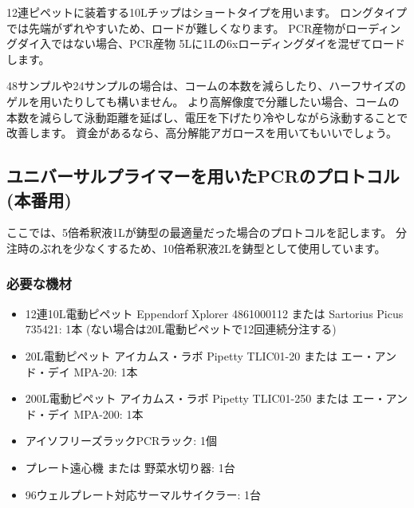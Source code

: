 \documentclass[titlepage,10pt,a4paper,uplatex]{jsbook}
\begin{document}
12連ピペットに装着する10{\textmu}Lチップはショートタイプを用います。
ロングタイプでは先端がずれやすいため、ロードが難しくなります。
PCR産物がローディングダイ入ではない場合、PCR産物 5{\textmu}Lに1{\textmu}Lの6xローディングダイを混ぜてロードします。

48サンプルや24サンプルの場合は、コームの本数を減らしたり、ハーフサイズのゲルを用いたりしても構いません。
より高解像度で分離したい場合、コームの本数を減らして泳動距離を延ばし、電圧を下げたり冷やしながら泳動することで改善します。
資金があるなら、高分解能アガロースを用いてもいいでしょう。

\subsection{ユニバーサルプライマーを用いたPCRのプロトコル (本番用)}

ここでは、5倍希釈液1{\textmu}Lが鋳型の最適量だった場合のプロトコルを記します。
分注時のぶれを少なくするため、10倍希釈液2{\textmu}Lを鋳型として使用しています。

\subsubsection{必要な機材}
\begin{itemize}
\item 12連10{\textmu}L電動ピペット Eppendorf Xplorer 4861000112 または Sartorius Picus 735421: 1本 (ない場合は20{\textmu}L電動ピペットで12回連続分注する)
\item 20{\textmu}L電動ピペット アイカムス・ラボ Pipetty TLIC01-20 または エー・アンド・デイ MPA-20: 1本
\item 200{\textmu}L電動ピペット アイカムス・ラボ Pipetty TLIC01-250 または エー・アンド・デイ MPA-200: 1本
\item アイソフリーズラックPCRラック: 1個
\item プレート遠心機 または 野菜水切り器: 1台
\item 96ウェルプレート対応サーマルサイクラー: 1台
\end{itemize}
\end{document}
